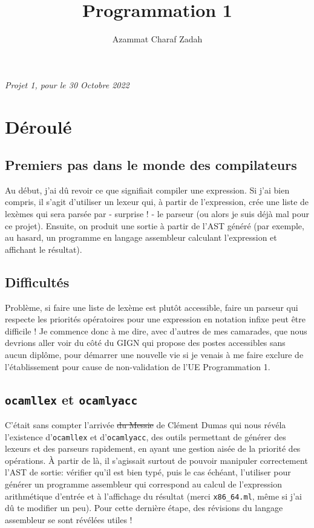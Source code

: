 \documentclass[12pt,french]{article}
\title{Programmation 1}
\author{Azammat Charaf Zadah}
\date{}
\date{}
\begin{document}
\maketitle
\begin{center}
    \textit{Projet 1, pour le 30 Octobre 2022}
\end{center}

\section{Déroulé}
\subsection{Premiers pas dans le monde des compilateurs}
Au début, j'ai dû revoir ce que signifiait compiler une expression. Si j'ai bien compris, il s'agit d'utiliser un lexeur qui, à partir de l'expression, crée une liste de lexèmes qui sera parsée par - surprise ! - le parseur (ou alors je suis déjà mal pour ce projet). Ensuite, on produit une sortie à partir de l'AST généré (par exemple, au hasard, un programme en langage assembleur calculant l'expression et affichant le résultat).
\subsection{Difficultés}
Problème, si faire une liste de lexème est plutôt accessible, faire un parseur qui respecte les priorités opératoires pour une expression en notation infixe peut être difficile ! Je commence donc à me dire, avec d'autres de mes camarades, que nous devrions aller voir du côté du GIGN qui propose des postes accessibles sans aucun diplôme, pour démarrer une nouvelle vie si je venais à me faire exclure de l'établissement pour cause de non-validation de l'UE Programmation 1.
\subsection{\texttt{ocamllex} et \texttt{ocamlyacc}}
C'était sans compter l'arrivée \sout{du Messie} de Clément Dumas qui nous révéla l'existence d'\texttt{ocamllex} et d'\texttt{ocamlyacc}, des outils permettant de générer des lexeurs et des parseurs rapidement, en ayant une gestion aisée de la priorité des opérations. À partir de là, il s'agissait surtout de pouvoir manipuler correctement l'AST de sortie: vérifier qu'il est bien typé, puis le cas échéant, l'utiliser pour générer un programme assembleur qui correspond au calcul de l'expression arithmétique d'entrée et à l'affichage du résultat (merci \texttt{x86\_64.ml}, même si j'ai dû te modifier un peu). Pour cette dernière étape, des révisions du langage assembleur se sont révélées utiles !
\newpage
\end{document}
